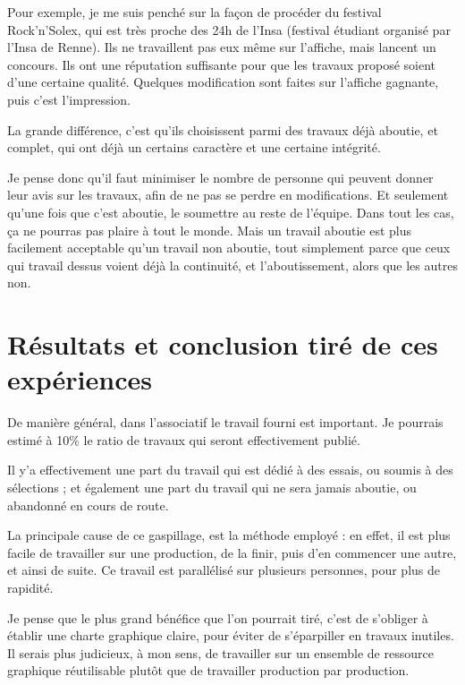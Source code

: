         Pour exemple, je me suis penché sur la façon de procéder du festival Rock'n'Solex, qui est très proche des 24h de l'Insa (festival étudiant organisé par l'Insa de Renne).
        Ils ne travaillent pas eux même sur l'affiche, mais lancent un concours. Ils ont une réputation suffisante pour que les travaux proposé soient d'une certaine qualité.
        Quelques modification sont faites sur l'affiche gagnante, puis c'est l'impression.
        
        La grande différence, c'est qu'ils choisissent parmi des travaux déjà aboutie, et complet, qui ont déjà un certains caractère et une certaine intégrité.
        
        Je pense donc qu'il faut minimiser le nombre de personne qui peuvent donner leur avis sur les travaux, afin de ne pas se perdre en modifications.
        Et seulement qu'une fois que c'est aboutie, le soumettre au reste de l'équipe. Dans tout les cas, ça ne pourras pas plaire à tout le monde. Mais un travail aboutie est plus facilement acceptable qu'un travail non aboutie, tout simplement parce que ceux qui travail dessus voient déjà la continuité, et l'aboutissement, alors que les autres non.
        
\section{Résultats et conclusion tiré de ces expériences}


    De manière général, dans l'associatif le travail fourni est important. Je pourrais estimé à 10\% le ratio de travaux qui seront effectivement publié.

    Il y'a effectivement une part du travail qui est dédié à des essais, ou soumis à des sélections ; et également une part du travail qui ne sera jamais aboutie, ou abandonné en cours de route.

    La principale cause de ce gaspillage, est la méthode employé : en effet, il est plus facile de travailler sur une production, de la finir, puis d'en commencer une autre, et ainsi de suite. Ce travail est parallélisé sur plusieurs personnes, pour plus de rapidité.

    Je pense que le plus grand bénéfice que l'on pourrait tiré, c'est de s'obliger à établir une charte graphique claire, pour éviter de s'éparpiller en travaux inutiles.
    Il serais plus judicieux, à mon sens, de travailler sur un ensemble de ressource graphique réutilisable plutôt que de travailler production par production.

